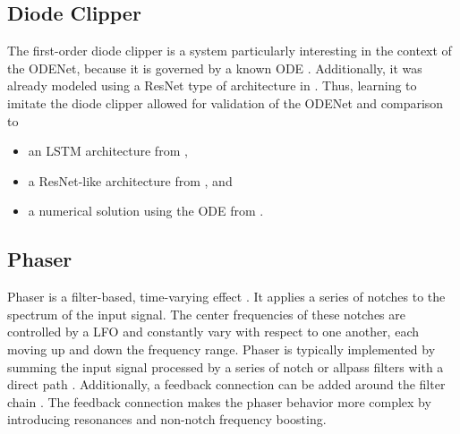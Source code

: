 \subsection{Diode Clipper}
\label{subsec:diode_clipper_intro}
The first-order diode clipper is a system particularly interesting in the context of the ODENet, because it is governed by a known \ac{ODE} \cite{Yeh2007,Yeh2008}. Additionally, it was already modeled using a \ac{ResNet} type of architecture in \cite{Parker2019}. Thus, learning to imitate the diode clipper allowed for validation of the ODENet and comparison to 
\begin{itemize}
  \item an \ac{LSTM} architecture from \cite{Wrightetal2020},
  \item a \ac{ResNet}-like architecture from \cite{Parker2019}, and
  \item a numerical solution using the \ac{ODE} from \cite{Yeh2007,Yeh2008}.
\end{itemize}
\begin{figure}
  
\end{figure}

\subsection{Phaser}
\label{subsec:phaser_intro}
Phaser is a filter-based, time-varying effect \cite{Zoelzer2011}. It applies a series of notches to the spectrum of the input signal. The center frequencies of these notches are controlled by a \ac{LFO} and constantly vary with respect to one another, each moving up and down the frequency range. Phaser is typically implemented by summing the input signal processed by a series of notch or allpass filters with a direct path \cite{Zoelzer2011}. Additionally, a feedback connection can be added around the filter chain \cite{Kiiski2016}. The feedback connection makes the phaser behavior more complex by introducing resonances and non-notch frequency boosting.

